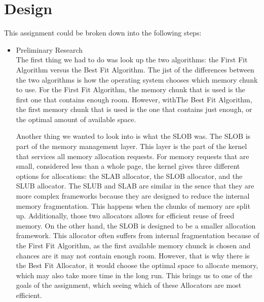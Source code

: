 \documentclass[10pt, onecolumn, letterpaper, draftclsnofoot]{IEEEtran}
\begin{document}
\section{\textbf{Design}}
This assignment could be broken down into the following steps:
\begin{itemize}
\item{Preliminary Research} \\   
\noindent The first thing we had to do was look up the two algorithms: the First Fit Algorithm versus the Best Fit Algorithm. The jist of the differences between the two algorithms is how the operating system chooses which memory chunk to use. For the First Fit Algorithm, the memory chunk that is used is the first one that contains enough room. However, withThe Best Fit Algorithm, the first memory chunk that is used is the one that contains just enough, or the optimal amount of available space. \newline 

Another thing we wanted to look into is what the SLOB was. The SLOB is part of the memory management layer. This layer is the part of the kernel that services all memory allocation requests. For memory requests that are small, considered less than a whole page, the kernel gives three different options for allocations: the SLAB allocator, the SLOB allocator, and the SLUB allocator. The SLUB and SLAB are similar in the sence that they are more complex frameworks because they are designed to reduce the internal memory fragmentation. This happens when the chunks of memory are split up. Additionally, those two allocators allows for efficient reuse of freed memory. On the other hand, the SLOB is designed to be a smaller allocation framework. This allocator often suffers from internal fragmentation because of the First Fit Algorithm, as the first available memory chunck is chosen and chances are it may not contain enough room. However, that is why there is the Best Fit Allocator, it would choose the optimal space to allocate memory, which may also take more time in the long run. This brings us to one of the goals of the assignment, which seeing which of these Allocators are most efficient. \newline 


\end{itemize}
\end{document}
